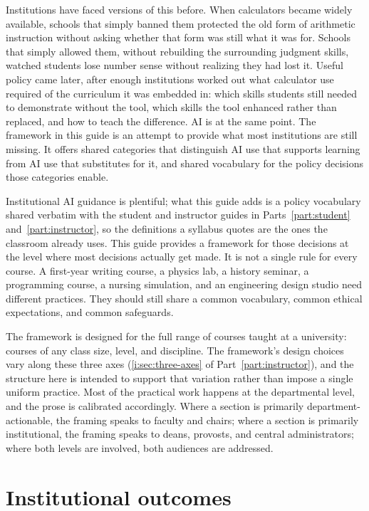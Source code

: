 \documentclass{SIAMbook2023}
\begin{document}
Institutions have faced versions of this before. When calculators became widely available, schools that simply banned them protected the old form of arithmetic instruction without asking whether that form was still what it was for. Schools that simply allowed them, without rebuilding the surrounding judgment skills, watched students lose number sense without realizing they had lost it. Useful policy came later, after enough institutions worked out what calculator use required of the curriculum it was embedded in: which skills students still needed to demonstrate without the tool, which skills the tool enhanced rather than replaced, and how to teach the difference. AI is at the same point. The framework in this guide is an attempt to provide what most institutions are still missing. It offers shared categories that distinguish AI use that supports learning from AI use that substitutes for it, and shared vocabulary for the policy decisions those categories enable.

Institutional AI guidance is plentiful; what this guide adds is a policy vocabulary shared verbatim with the student and instructor guides in Parts~\ref{part:student} and~\ref{part:instructor}, so the definitions a syllabus quotes are the ones the classroom already uses. This guide provides a framework for those decisions at the level where most decisions actually get made. It is not a single rule for every course. A first-year writing course, a physics lab, a history seminar, a programming course, a nursing simulation, and an engineering design studio need different practices. They should still share a common vocabulary, common ethical expectations, and common safeguards.

The framework is designed for the full range of courses taught at a university: courses of any class size, level, and discipline. The framework's design choices vary along these three axes (\cref{i:sec:three-axes} of Part~\ref{part:instructor}), and the structure here is intended to support that variation rather than impose a single uniform practice. Most of the practical work happens at the departmental level, and the prose is calibrated accordingly. Where a section is primarily department-actionable, the framing speaks to faculty and chairs; where a section is primarily institutional, the framing speaks to deans, provosts, and central administrators; where both levels are involved, both audiences are addressed.

\section{Institutional outcomes}
\label{u:sec:institutional-outcomes}%
\end{document}
